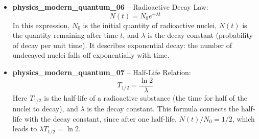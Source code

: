 \documentclass[11pt,a4paper]{article}
\begin{document}
\begin{itemize}
\item \textbf{physics\_modern\_quantum\_06} -- Radioactive Decay Law: 
\[N(t) = N_0 e^{-\lambda t}\]
In this expression, $N_0$ is the initial quantity of radioactive nuclei, $N(t)$ is the quantity remaining after time $t$, and $\lambda$ is the decay constant (probability of decay per unit time). It describes exponential decay: the number of undecayed nuclei falls off exponentially with time.

\item \textbf{physics\_modern\_quantum\_07} -- Half-Life Relation: 
\[T_{1/2} = \frac{\ln 2}{\lambda}\]
Here $T_{1/2}$ is the half-life of a radioactive substance (the time for half of the nuclei to decay), and $\lambda$ is the decay constant. This formula connects the half-life with the decay constant, since after one half-life, $N(t)/N_0 = 1/2$, which leads to $\lambda T_{1/2} = \ln 2$.
\end{itemize}
\end{document}
